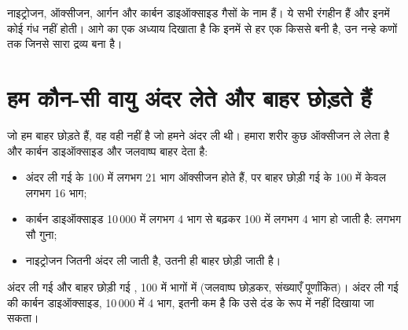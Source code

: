 \begin{remark}[गैसों के नाम]\label{rem:g4:air-a-mixture-of-gases:names}
नाइट्रोजन, ऑक्सीजन, आर्गन और कार्बन डाइऑक्साइड गैसों के नाम हैं। ये
सभी रंगहीन हैं और इनमें कोई गंध नहीं होती। आगे का एक अध्याय दिखाता है
कि इनमें से हर एक किससे बनी है, उन नन्हे कणों तक जिनसे सारा द्रव्य बना है।
\end{remark}

\section{हम कौन-सी वायु अंदर लेते और बाहर छोड़ते हैं}

\begin{proposition}[छोड़ी हुई साँस की वायु]\label{prop:g4:air-a-mixture-of-gases:breath}
जो  हम बाहर छोड़ते हैं, वह वही नहीं है जो हमने अंदर ली थी। हमारा
शरीर कुछ ऑक्सीजन ले लेता है और कार्बन डाइऑक्साइड और जलवाष्प बाहर देता है:
\begin{itemize}
  \item अंदर ली गई  के 100 में लगभग 21 भाग ऑक्सीजन होते हैं, पर
        बाहर छोड़ी गई  के 100 में केवल लगभग 16 भाग;
  \item कार्बन डाइऑक्साइड 10\,000 में लगभग 4 भाग से बढ़कर 100 में लगभग 4
        भाग हो जाती है: लगभग सौ गुना;
  \item नाइट्रोजन जितनी अंदर ली जाती है, उतनी ही बाहर छोड़ी जाती है।
\end{itemize}
\end{proposition}

\begin{omfigure}

{\small अंदर ली गई और बाहर छोड़ी गई , 100 में भागों में (जलवाष्प छोड़कर,
संख्याएँ पूर्णांकित)। अंदर ली गई  की कार्बन डाइऑक्साइड, 10\,000 में
4 भाग, इतनी कम है कि उसे दंड के रूप में नहीं दिखाया जा सकता।}
\end{omfigure}

